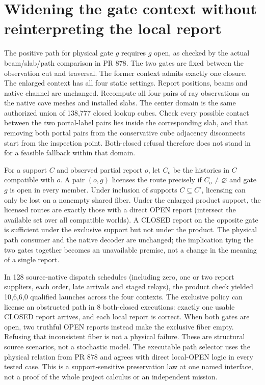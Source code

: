 \documentclass{article}
\begin{document}
\section*{Widening the gate context without reinterpreting the local report}
The positive path for physical gate $g$ requires $g$ open, as checked
by the actual beam/slab/path comparison in PR 878. The two gates are
fixed between the observation cut and traversal. The former context
admits exactly one closure. The enlarged context has all four static
settings. Report positions, beams and native channel are unchanged.
Recompute all four pairs of ray observations on the native cave meshes
and installed slabs. The center domain is the same authorized union of
138,777 closed lookup cubes. Check every possible contact between the
two portal-label pairs lies inside the corresponding slab, and that
removing both portal pairs from the conservative cube adjacency
disconnects start from the inspection point. Both-closed refusal therefore
does not stand in for a feasible fallback within that domain.

For a support $C$ and observed partial report $o$, let $C_o$ be
the histories in $C$ compatible with $o$. A pair $(o,g)$ licenses the
route precisely if $C_o\ne\varnothing$ and gate $g$ is open in every
member. Under inclusion of supports $C\subseteq C'$, licensing can
only be lost on a nonempty shared fiber. Under the enlarged product
support, the licensed routes are exactly those with a direct OPEN
report (intersect the available set over all compatible worlds).
A CLOSED report on the opposite gate is sufficient under the exclusive
support but not under the product. The physical path consumer and
the native decoder are unchanged; the implication tying the two
gates together becomes an unavailable premise, not a change in the
meaning of a single report.

In 128 source-native dispatch schedules (including zero, one or two
report suppliers, each order, late arrivals and staged relays), the
product check yielded 10,6,6,0 qualified launches across the four
contexts. The exclusive policy can license an obstructed path in
8 both-closed executions: exactly one usable CLOSED report arrives,
and each local report is correct. When both gates are open, two
truthful OPEN reports instead make the exclusive fiber empty. Refusing
that inconsistent fiber is not a physical failure.
These are structural source scenarios, not a stochastic model.
The executable path selector uses the physical relation from PR 878
and agrees with direct local-OPEN logic in every tested case.
This is a support-sensitive preservation law at one named interface,
not a proof of the whole project calculus or an independent mission.
\end{document}
